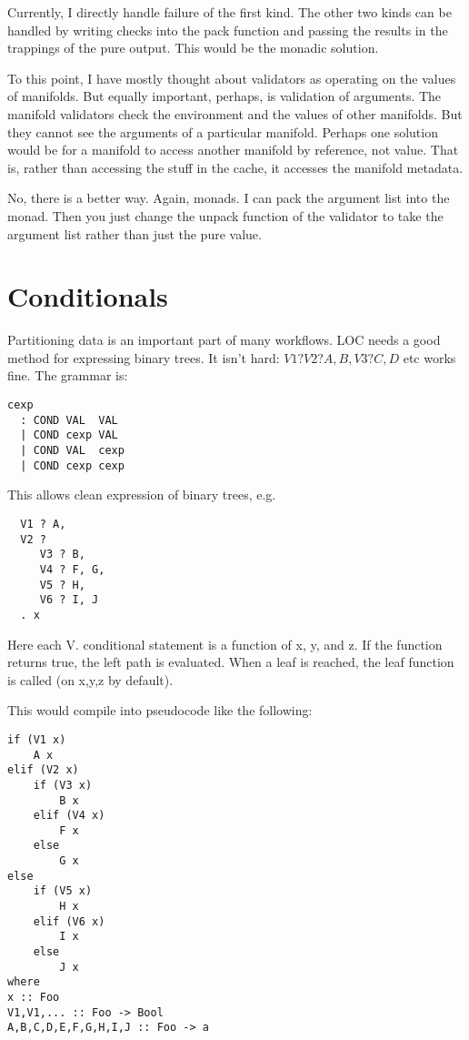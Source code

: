 \documentclass[12pt]{article}
\begin{document}
Currently, I directly handle failure of the first kind. The other two kinds can
be handled by writing checks into the pack function and passing the results in
the trappings of the pure output. This would be the monadic solution.

To this point, I have mostly thought about validators as operating on the
values of manifolds. But equally important, perhaps, is validation of
arguments. The manifold validators check the environment and the values of
other manifolds. But they cannot see the arguments of a particular manifold.
Perhaps one solution would be for a manifold to access another manifold by
reference, not value. That is, rather than accessing the stuff in the cache, it
accesses the manifold metadata.

No, there is a better way. Again, monads. I can pack the argument list into the
monad. Then you just change the unpack function of the validator to take the
argument list rather than just the pure value.

\section{Conditionals}

Partitioning data is an important part of many workflows. LOC needs a good
method for expressing binary trees. It isn't hard: $V1 ? V2 ? A, B, V3 ? C, D$ etc
works fine. The grammar is:

\begin{verbatim}
cexp
  : COND VAL  VAL
  | COND cexp VAL
  | COND VAL  cexp
  | COND cexp cexp
\end{verbatim}

This allows clean expression of binary trees, e.g.

\begin{verbatim}
  V1 ? A,
  V2 ?
     V3 ? B,
     V4 ? F, G,
     V5 ? H,
     V6 ? I, J
  . x
\end{verbatim}

Here each V. conditional statement is a function of x, y, and z. If the
function returns true, the left path is evaluated. When a leaf is reached, the
leaf function is called (on x,y,z by default).

This would compile into pseudocode like the following:

\begin{verbatim}
if (V1 x)
    A x
elif (V2 x)
    if (V3 x)
        B x
    elif (V4 x)
        F x
    else
        G x
else
    if (V5 x)
        H x
    elif (V6 x)
        I x
    else
        J x
where
x :: Foo
V1,V1,... :: Foo -> Bool
A,B,C,D,E,F,G,H,I,J :: Foo -> a
\end{verbatim}
\end{document}
